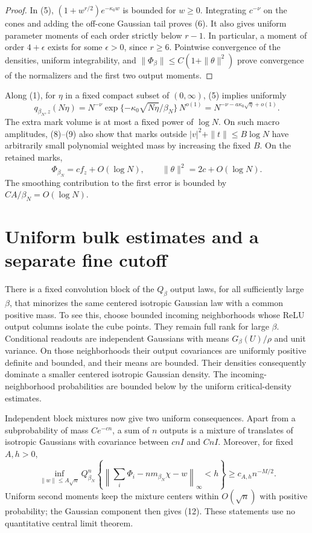 \documentclass[11pt]{article}
\begin{document}
\begin{proof}
In (5), $(1+w^{r/2})e^{-\kappa_0 w}$ is bounded for $w\ge0$.
Integrating $c^{-\nu}$ on the cones and adding the off-cone Gaussian
tail proves (6). It also gives uniform parameter moments of each order
strictly below $r-1$. In particular, a moment of order $4+\epsilon$
exists for some $\epsilon>0$, since $r\ge6$. Pointwise convergence of
the densities, uniform integrability, and
$\|\Phi_\beta\|\le C(1+\|\theta\|^2)$ prove convergence of the
normalizers and the first two output moments.
\end{proof}

Along (1), for $\eta$ in a fixed compact subset of $(0,\infty)$,
(5) implies uniformly
\[
 q_{\beta_N,z}(N\eta)
 =N^{-\nu}\exp\{-\kappa_0\sqrt{N\eta}/\beta_N\}\,N^{o(1)}
 =N^{-\nu-a\kappa_0\sqrt\eta+o(1)}.                 \tag{10}
\]
The extra mark volume is at most a fixed power of $\log N$.
On such macro amplitudes, (8)--(9) also show that marks outside
$|v|^2+\|t\|\le B\log N$ have arbitrarily small polynomial weighted
mass by increasing the fixed $B$. On the retained marks,
\[
        \Phi_{\beta_N}=cf_z+O(\log N),\qquad
        \|\theta\|^2=2c+O(\log N).                  \tag{11}
\]
The smoothing contribution to the first error is bounded by
$CA/\beta_N=O(\log N)$.

\section{Uniform bulk estimates and a separate fine cutoff}
There is a fixed convolution block of the $Q_\beta$ output laws, for
all sufficiently large $\beta$, that minorizes the same centered
isotropic Gaussian law with a common positive mass. To see this, choose
bounded incoming neighborhoods whose ReLU output columns isolate the
cube points. They remain full rank for large $\beta$. Conditional
readouts are independent Gaussians with means $G_\beta(U)/\rho$ and
unit variance. On those neighborhoods their output covariances are
uniformly positive definite and bounded, and their means are bounded.
Their densities consequently dominate a smaller centered isotropic
Gaussian density. The incoming-neighborhood probabilities are bounded
below by the uniform critical-density estimates.

Independent block mixtures now give two uniform consequences. Apart
from a subprobability of mass $Ce^{-c n}$, a sum of $n$ outputs is a
mixture of translates of isotropic Gaussians with covariance between
$cnI$ and $CnI$. Moreover, for fixed $A,h>0$,
\[
 \inf_{\|w\|\le A\sqrt n}
 Q_{\beta_N}^{n}\left\{
 \left\|\sum_i\Phi_i-nm_{\beta_N}\chi-w\right\|_\infty<h
 \right\}\ge c_{A,h}n^{-M/2}.                       \tag{12}
\]
Uniform second moments keep the mixture centers within $O(\sqrt n)$
with positive probability; the Gaussian component then gives (12).
These statements use no quantitative central limit theorem.
\end{document}
